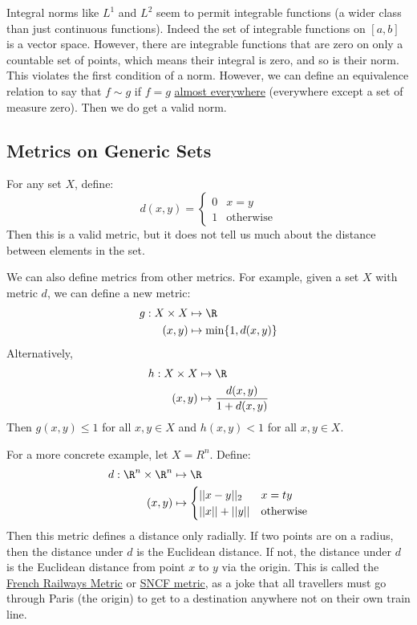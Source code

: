 \documentclass[../Main.tex]{subfiles}
\begin{document}
\begin{remark}
    Integral norms like $L^1$ and $L^2$ seem to permit integrable functions (a wider class than just continuous functions). Indeed the set of integrable functions on $[a, b]$ is a vector space. However, there are integrable functions that are zero on only a countable set of points, which means their integral is zero, and so is their norm. This violates the first condition of a norm. However, we can define an equivalence relation to say that $f \sim g$ if $f = g$ \underline{almost everywhere} (everywhere except a set of measure zero). Then we do get a valid norm.
\end{remark}
\subsection{Metrics on Generic Sets}
For any set $X$, define:
\begin{equation*}
    d(x, y) =
    \begin{cases}
        0 & x = y \\
        1 & \text{otherwise}
    \end{cases}
\end{equation*}
Then this is a valid metric, but it does not tell us much about the distance between elements in the set.

We can also define metrics from other metrics. For example, given a set $X$ with metric $d$, we can define a new metric:
\begin{align*}
    g : X \times X &\mapsto \R\\
    (x, y) &\mapsto \min\{1, d(x, y)\}
\end{align*}
Alternatively,
\begin{align*}
    h : X \times X &\mapsto \R\\
    (x, y) &\mapsto \frac{d(x, y)}{1 + d(x, y)}
\end{align*}
Then $g(x, y) \leq 1$ for all $x, y \in X$ and $h(x, y) < 1$ for all $x, y \in X$.

For a more concrete example, let $X = R^n$. Define:
\begin{align*}
    d : \R^n \times \R^n &\mapsto \R\\
    (x, y) &\mapsto \begin{cases}
        ||x - y||_2 & x = ty \\
        ||x|| + ||y|| & \text{otherwise}
    \end{cases}
\end{align*}
Then this metric defines a distance only radially. If two points are on a radius, then the distance under $d$ is the Euclidean distance. If not, the distance under $d$ is the Euclidean distance from point $x$ to $y$ via the origin. This is called the \underline{French Railways Metric} or \underline{SNCF metric}, as a joke that all travellers must go through Paris (the origin) to get to a destination anywhere not on their own train line.
\end{document}
